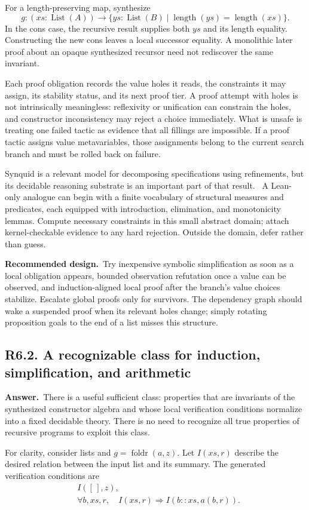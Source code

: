 \documentclass[11pt,a4paper]{article}
\newcommand{\qid}[3]{\subsection{#2. #3}\label{#1}}
\newcommand{\answer}{\noindent\textbf{Answer.}\ }
\newcommand{\proposal}{\noindent\textbf{Recommended design.}\ }
\newcommand{\List}{\operatorname{List}}
\newcommand{\fold}{\operatorname{foldr}}
\theoremstyle{remark}
\begin{document}
For a length-preserving map, synthesize
\[
 g:(xs:\List(A))\to
       \{ys:\List(B)\mid \operatorname{length}(ys)=\operatorname{length}(xs)\}.
\]
In the cons case, the recursive result supplies both $ys$ and its length equality. Constructing the new cons leaves a local successor equality. A monolithic later proof about an opaque synthesized recursor need not rediscover the same invariant.

Each proof obligation records the value holes it reads, the constraints it may assign, its stability status, and its next proof tier. A proof attempt with holes is not intrinsically meaningless: reflexivity or unification can constrain the holes, and constructor inconsistency may reject a choice immediately. What is unsafe is treating one failed tactic as evidence that all fillings are impossible. If a proof tactic assigns value metavariables, those assignments belong to the current search branch and must be rolled back on failure.

Synquid is a relevant model for decomposing specifications using refinements, but its decidable reasoning substrate is an important part of that result.~\cite{synquid} A Lean-only analogue can begin with a finite vocabulary of structural measures and predicates, each equipped with introduction, elimination, and monotonicity lemmas. Compute necessary constraints in this small abstract domain; attach kernel-checkable evidence to any hard rejection. Outside the domain, defer rather than guess.

\proposal Try inexpensive symbolic simplification as soon as a local obligation appears, bounded observation refutation once a value can be observed, and induction-aligned local proof after the branch's value choices stabilize. Escalate global proofs only for survivors. The dependency graph should wake a suspended proof when its relevant holes change; simply rotating proposition goals to the end of a list misses this structure.

\qid{q62}{R6.2}{A recognizable class for induction, simplification, and arithmetic}
\answer There is a useful sufficient class: properties that are invariants of the synthesized constructor algebra and whose local verification conditions normalize into a fixed decidable theory. There is no need to recognize all true properties of recursive programs to exploit this class.

For clarity, consider lists and $g=\fold(a,z)$. Let $I(xs,r)$ describe the desired relation between the input list and its summary. The generated verification conditions are
\begin{align}
 &I([\,],z),\label{eq:vcbase}\\
 &\forall b,xs,r,\quad I(xs,r)\Longrightarrow I(b::xs,a(b,r)).\label{eq:vcstep}
\end{align}
\end{document}
